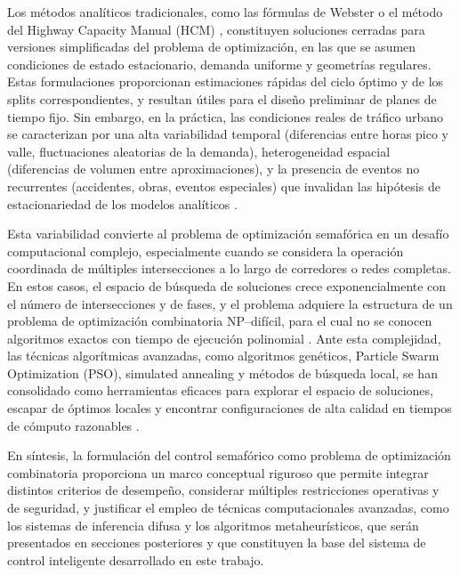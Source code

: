 Los métodos analíticos tradicionales, como las fórmulas de Webster \cite{webster1958traffic} o el método del Highway Capacity Manual (HCM) \cite{roess2019traffic}, constituyen soluciones cerradas para versiones simplificadas del problema de optimización, en las que se asumen condiciones de estado estacionario, demanda uniforme y geometrías regulares. Estas formulaciones proporcionan estimaciones rápidas del ciclo óptimo y de los splits correspondientes, y resultan útiles para el diseño preliminar de planes de tiempo fijo. Sin embargo, en la práctica, las condiciones reales de tráfico urbano se caracterizan por una alta variabilidad temporal (diferencias entre horas pico y valle, fluctuaciones aleatorias de la demanda), heterogeneidad espacial (diferencias de volumen entre aproximaciones), y la presencia de eventos no recurrentes (accidentes, obras, eventos especiales) que invalidan las hipótesis de estacionariedad de los modelos analíticos \cite{papageorgiou2003review,stevanovic2010adaptive}.

Esta variabilidad convierte al problema de optimización semafórica en un desafío computacional complejo, especialmente cuando se considera la operación coordinada de múltiples intersecciones a lo largo de corredores o redes completas. En estos casos, el espacio de búsqueda de soluciones crece exponencialmente con el número de intersecciones y de fases, y el problema adquiere la estructura de un problema de optimización combinatoria NP--difícil, para el cual no se conocen algoritmos exactos con tiempo de ejecución polinomial \cite{wong1998optimizing,ceylan2004traffic}. Ante esta complejidad, las técnicas algorítmicas avanzadas, como algoritmos genéticos, Particle Swarm Optimization (PSO), simulated annealing y métodos de búsqueda local, se han consolidado como herramientas eficaces para explorar el espacio de soluciones, escapar de óptimos locales y encontrar configuraciones de alta calidad en tiempos de cómputo razonables \cite{ceylan2004traffic,papageorgiou2003review}.

En síntesis, la formulación del control semafórico como problema de optimización combinatoria proporciona un marco conceptual riguroso que permite integrar distintos criterios de desempeño, considerar múltiples restricciones operativas y de seguridad, y justificar el empleo de técnicas computacionales avanzadas, como los sistemas de inferencia difusa y los algoritmos metaheurísticos, que serán presentados en secciones posteriores y que constituyen la base del sistema de control inteligente desarrollado en este trabajo.


